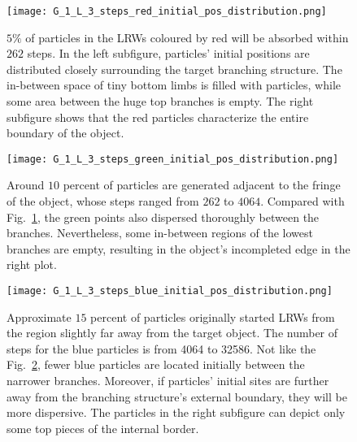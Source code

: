        
       
       \begin{figure}
         \centering
         \texttt{[image: G\_1\_L\_3\_steps\_red\_initial\_pos\_distribution.png]}
         \caption{$5\%$ of particles in the LRWs coloured by red will
           be absorbed within $262$ steps. In the left subfigure,
           particles' initial positions are distributed closely
           surrounding the target branching structure. The in-between
           space of tiny bottom limbs is filled with particles, while
           some area between the huge top branches is empty. The right
           subfigure shows that the red particles characterize the
           entire boundary of the object.}
         \label{fig:G_1_L_3_steps_red_initial_pos_distribution}
       \end{figure}



       \begin{figure}
         \centering
         \texttt{[image: G\_1\_L\_3\_steps\_green\_initial\_pos\_distribution.png]}
         \caption{Around $10$ percent of particles are generated
           adjacent to the fringe of the object, whose steps ranged
           from $262$ to $4064$. Compared with
           Fig.~\ref{fig:G_1_L_3_steps_red_initial_pos_distribution},
           the green points also dispersed thoroughly between the
           branches. Nevertheless, some in-between regions of the
           lowest branches are empty, resulting in the object's
           incompleted edge in the right plot.}
         \label{fig:G_1_L_3_steps_green_initial_pos_distribution}
       \end{figure}


       \begin{figure}
         \centering
         \texttt{[image: G\_1\_L\_3\_steps\_blue\_initial\_pos\_distribution.png]}
         \caption{Approximate $15$ percent of particles originally
           started LRWs from the region slightly far away from the
           target object. The number of steps for the blue particles
           is from 4064 to 32586. Not like the
           Fig.~\ref{fig:G_1_L_3_steps_green_initial_pos_distribution},
           fewer blue particles are located initially between the
           narrower branches. Moreover, if particles' initial sites
           are further away from the branching structure's external
           boundary, they will be more dispersive. The particles in
           the right subfigure can depict only some top pieces of the
           internal border.}
         \label{fig:G_1_L_3_steps_blue_initial_pos_distribution}
       \end{figure}
       

